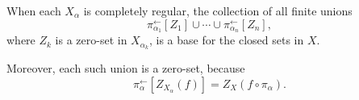 When each $X_{\alpha}$ is completely regular, the collection of all finite unions
$$\pi_{\alpha_1}^{\leftarrow}[Z_1] \cup \cdots \cup \pi_{\alpha_n}^{\leftarrow}[Z_n],$$
where $Z_k$ is a zero-set in $X_{\alpha_k}$, is a base for the closed sets in $X$.

Moreover, each such union is a zero-set, because
$$\pi_{\alpha}^{\leftarrow}[Z_{X_{\alpha}}(f)] = Z_X(f \circ \pi_{\alpha}).$$
